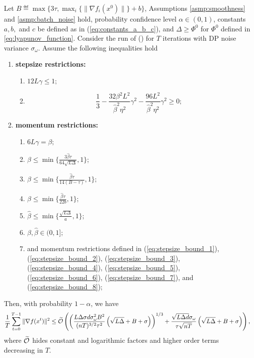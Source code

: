 \documentclass[a4paper,11pt]{article}
\begin{document}
\begin{theorem}
    Let $B\eqdef \max\{3\tau, \max_i\{\|\nabla f_i(x^0)\|\}+b\}$, Assumptions \ref{asmp:smoothness} and \ref{asmp:batch_noise} hold, probability confidence level $\alpha\in(0,1)$, constants $a,b,$ and $c$ be defined as in (\ref{eq:constants_a_b_c}), and $\Delta \ge \Phi^0$ for $\Phi^0$ defined in \eqref{eq:lyapunov_function}. Consider the run of  () for $T$ iterations with DP noise variance $\sigma_{\omega}$.
    Assume the following inequalities hold
    \begin{enumerate}
        \item {\bf stepsize restrictions:} 
        \begin{enumerate}[$i)$]
        \item $12L\gamma \le 1;$
        \item \begin{equation}\label{eq:quadratic_stepsize_restriction}
        \frac{1}{3}
        - \frac{32\beta^2L^2}{\hat{\beta}^2\eta^2}\gamma^2 
        - \frac{96L^2}{\hat{\beta}^2\eta^2}\gamma^2 \ge 0;
        \end{equation}
        \end{enumerate}
        \item {\bf momentum restrictions:} 
        \begin{enumerate}[$i)$]
        \item  $6L\gamma = \beta;$
        \item $\beta \le \min\{\frac{3\hat{\beta}\tau}{64\sqrt{L\Delta}}, 1\}$;
        \item $\beta \le \min\{\frac{\hat{\beta}\tau}{14(B-\tau)}, 1\};$
        \item $\beta \le \min\{\frac{\hat{\beta}\tau}{22b}, 1\}$;
        \item $\hat{\beta} \le \min\{\frac{\sqrt{L\Delta}}{a}, 1\}$;
        \item $\beta, \hat{\beta} \in (0,1];$
        \item and momentum restrictions defined in (\ref{eq:stepsize_bound_1}), (\ref{eq:stepsize_bound_2}), (\ref{eq:stepsize_bound_3}), (\ref{eq:stepsize_bound_4}), (\ref{eq:stepsize_bound_5}), (\ref{eq:stepsize_bound_6}), (\ref{eq:stepsize_bound_7}), and (\ref{eq:stepsize_bound_8});
        \end{enumerate}
    \end{enumerate}
    Then, with probability $1-\alpha$, we have 
   \begin{align*}
        \frac{1}{T}\sum_{t=0}^{T-1}\|\nabla f(x^t)\|^2 \le 
        \widetilde{\mathcal O}\left(\left(
        \frac{L\Delta\sigma d\sigma_{\omega}^{2}B^{2}}{(nT)^{3/2}\tau^{2}} \left(\sqrt{L\Delta}
        + B
        + \sigma\right)\right)^{1/3}
        +
        \frac{\sqrt{L\Delta d}\sigma_{\omega}}{\tau\sqrt{nT}}\left(\sqrt{L\Delta}+ B + \sigma\right)
        \right),
    \end{align*}
    where $\widetilde{\mathcal O}$ hides constant and logarithmic factors and higher order terms decreasing in $T$.
\end{theorem}
\end{document}
